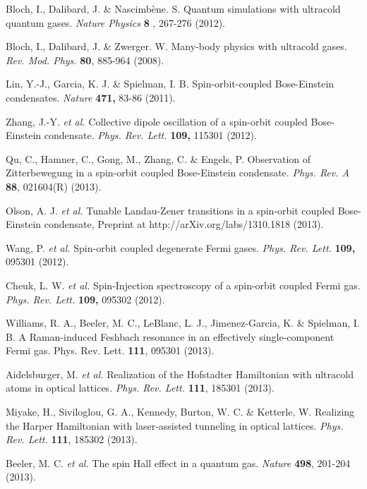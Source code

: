 \documentclass[prl,aps,twocolumn,floatfix]{revtex4}
\begin{document}
\begin{thebibliography}{99}
 Bloch, I., Dalibard, J. \& Nascimb\`{e}ne. S. Quantum
simulations with ultracold quantum gases. \textit{Nature Physics} \textbf{8}%
, 267-276 (2012).

 Bloch, I., Dalibard, J. \& Zwerger. W. Many-body physics
with ultracold gases. \textit{Rev. Mod. Phys.} \textbf{80}, 885-964 (2008).

 Lin, Y.-J., Garcia, K. J. \& Spielman, I. B.
Spin-orbit-coupled Bose-Einstein condensates. \textit{Nature} \textbf{471,}
83-86 (2011).

 Zhang, J.-Y. \textit{et al.} Collective dipole oscillation of
a spin-orbit coupled Bose-Einstein condensate. \textit{Phys. Rev. Lett.}
\textbf{109,} 115301 (2012).

 Qu, C., Hamner, C., Gong, M., Zhang, C. \& Engels, P.
Observation of Zitterbewegung in a spin-orbit coupled Bose-Einstein
condensate. \textit{Phys. Rev. A} \textbf{88}, 021604(R) (2013).

 Olson, A. J. \textit{et al.} Tunable Landau-Zener transitions
in a spin-orbit coupled Bose-Einstein condensate, Preprint at
http://arXiv.org/labs/1310.1818 (2013).

 Wang, P. \textit{et al.} Spin-orbit coupled degenerate Fermi
gases. \textit{Phys. Rev. Lett.} \textbf{109,} 095301 (2012).

 Cheuk, L. W. \textit{et al.} Spin-Injection spectroscopy of
a spin-orbit coupled Fermi gas. \textit{Phys. Rev. Lett.} \textbf{109,}
095302 (2012).

 Williams, R. A., Beeler, M. C., LeBlanc, L. J.,
Jimenez-Garcia, K. \& Spielman, I. B. A Raman-induced Feshbach resonance in
an effectively single-component Fermi gas. Phys. Rev. Lett. \textbf{111},
095301 (2013).

 Aidelsburger, M. \textit{et al.} Realization of the
Hofstadter Hamiltonian with ultracold atoms in optical lattices. \textit{%
Phys. Rev. Lett.} \textbf{111}, 185301 (2013).

 Miyake, H., Siviloglou, G. A., Kennedy, Burton, W. C. \&
Ketterle, W. Realizing the Harper Hamiltonian with laser-assisted tunneling
in optical lattices. \textit{Phys. Rev. Lett.} \textbf{111}, 185302 (2013).

 Beeler, M. C. \textit{et al.} The spin Hall effect in a
quantum gas. \textit{Nature} \textbf{498}, 201-204 (2013).


\end{thebibliography}
\end{document}
